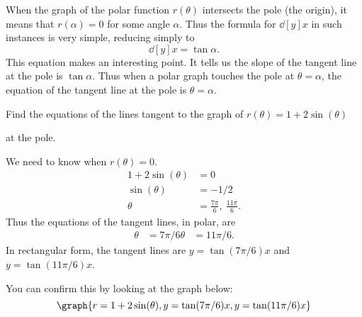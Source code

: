 \documentclass{ximera}
\begin{document}
When the graph of the polar function $r(\theta)$ intersects the pole
(the origin), it means that $r(\alpha)=0$ for some angle
$\alpha$. Thus the formula for $\dd[y]{x}$ in such instances is very
simple, reducing simply to
\[
\dd[y]{x}= \tan \alpha.
\]
This equation makes an interesting point. It tells us the slope of the
tangent line at the pole is $\tan \alpha$. Thus when a polar graph
touches the pole at $\theta=\alpha$, the equation of the tangent line
at the pole is $\theta=\alpha$. 

\begin{example}
  Find the equations of the lines tangent to the graph of
  $r(\theta)=1+2\sin(\theta)$
  \begin{image}
  \end{image}
  at the pole.
  \begin{explanation}
    We need to know when $r(\theta)=0$.
    \begin{align*}
      1+2\sin(\theta) &= 0\\
      \sin(\theta) &= -1/2\\
      \theta &= \frac{7\pi}{6},\ \frac{11\pi}6.
    \end{align*}
    Thus the equations of the tangent lines, in polar, are
    \begin{align*}
      \theta &=7\pi/6 \theta &= 11\pi/6.
    \end{align*}
    In rectangular form, the tangent lines are $y=\tan(7\pi/6)x$ and
    $y=\tan(11\pi/6)x$.
    \begin{prompt}
     You can confirm this by looking at the graph below:
     \[
     \graph{r=1+2\sin(\theta),y=\tan(7\pi/6)x,y=\tan(11\pi/6)x}
     \]
   \end{prompt}
  \end{explanation}
\end{example}
\end{document}
